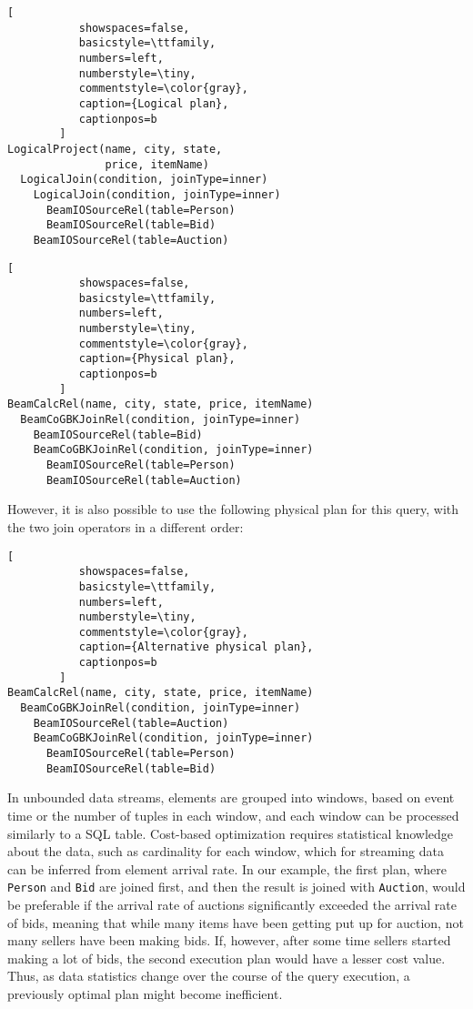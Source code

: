 \begin{lstlisting}[
           showspaces=false,
           basicstyle=\ttfamily,
           numbers=left,
           numberstyle=\tiny,
           commentstyle=\color{gray},
           caption={Logical plan}, 
           captionpos=b
        ]
LogicalProject(name, city, state, 
               price, itemName)
  LogicalJoin(condition, joinType=inner) 
    LogicalJoin(condition, joinType=inner)
      BeamIOSourceRel(table=Person)
      BeamIOSourceRel(table=Bid)
    BeamIOSourceRel(table=Auction)
\end{lstlisting}

\begin{lstlisting}[
           showspaces=false,
           basicstyle=\ttfamily,
           numbers=left,
           numberstyle=\tiny,
           commentstyle=\color{gray},
           caption={Physical plan}, 
           captionpos=b
        ]
BeamCalcRel(name, city, state, price, itemName)
  BeamCoGBKJoinRel(condition, joinType=inner)
    BeamIOSourceRel(table=Bid)
    BeamCoGBKJoinRel(condition, joinType=inner)
      BeamIOSourceRel(table=Person)
      BeamIOSourceRel(table=Auction)
\end{lstlisting}


However, it is also possible to use the following physical plan for this query, with the two join operators in a different order: \\

\begin{lstlisting}[
           showspaces=false,
           basicstyle=\ttfamily,
           numbers=left,
           numberstyle=\tiny,
           commentstyle=\color{gray},
           caption={Alternative physical plan}, 
           captionpos=b
        ]
BeamCalcRel(name, city, state, price, itemName)
  BeamCoGBKJoinRel(condition, joinType=inner)
    BeamIOSourceRel(table=Auction)
    BeamCoGBKJoinRel(condition, joinType=inner)
      BeamIOSourceRel(table=Person)
      BeamIOSourceRel(table=Bid)        
\end{lstlisting}


In unbounded data streams, elements are grouped into windows, based on event time or the number of tuples in each window, and each window can be processed similarly to a SQL table. Cost-based optimization requires statistical knowledge about the data, such as cardinality for each window, which for streaming data can be inferred from element arrival rate. In our example, the first plan, where \texttt{Person} and \texttt{Bid} are joined first, and then the result is joined with \texttt{Auction}, would be preferable if the arrival rate of auctions significantly exceeded the arrival rate of bids, meaning that while many items have been getting put up for auction, not many sellers have been making bids. If, however, after some time sellers started making a lot of bids, the second execution plan would have a lesser cost value. Thus, as data statistics change over the course of the query execution, a previously optimal plan might become inefficient. 

